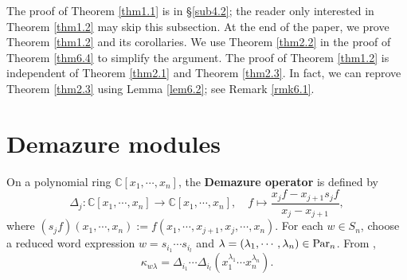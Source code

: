 \documentclass[12pt]{amsart}
\theoremstyle{definition}
\theoremstyle{remark}
\newcommand{\C}{\mathbb{C}}
\newcommand{\Parn}{{\rm Par}_n}
\begin{document}
The proof of Theorem \ref{thm1.1} is in \S \ref{sub4.2}; the reader only interested in Theorem \ref{thm1.2} may skip this subsection. At the end of the paper, we prove Theorem \ref{thm1.2} and its corollaries. We use Theorem \ref{thm2.2} in the proof of Theorem \ref{thm6.4} to simplify the argument. The proof of Theorem \ref{thm1.2} is independent of Theorem \ref{thm2.1} and Theorem \ref{thm2.3}. In fact, we can reprove Theorem \ref{thm2.3} using Lemma \ref{lem6.2}; see Remark \ref{rmk6.1}.



\section{Demazure modules}\label{sec3}

On a polynomial ring $\C [x_1 , \cdots , x_n]$, the \textbf{Demazure operator} is defined by
\begin{equation}\label{eqn3.31}
\Delta_j : \C [x_1 , \cdots , x_n] \rightarrow \C [x_1 , \cdots , x_n], \quad f \mapsto \frac{x_j f - x_{j+1} s_j f}{x_j - x_{j+1}},
\end{equation}
where $(s_j f)(x_1 , \cdots , x_n) := f(x_1, \cdots , x_{j+1} , x_j , \cdots , x_n)$. For each $w \in S_n$, choose a reduced word expression $w = s_{i_1} \cdots s_{i_l}$ and $\lambda = (\lambda_1 , \cdots , \lambda_n ) \in \Parn$. From \cite[Theorem 5]{MR1887117},
\begin{equation}
\kappa_{w\lambda} = \Delta_{i_1} \cdots \Delta_{i_l} (x_1^{\lambda_1} \cdots x_n^{\lambda_n}).
\end{equation}
\end{document}
